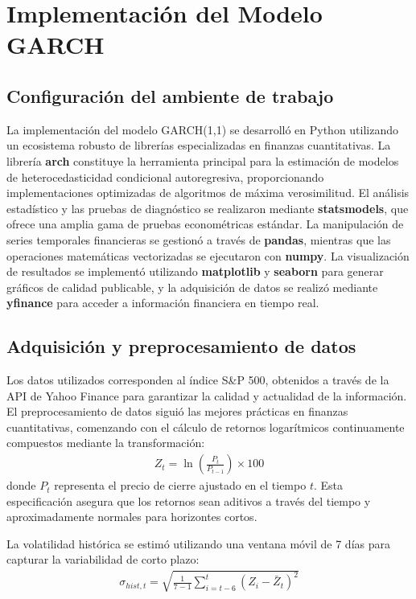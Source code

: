 \section{Implementación del Modelo GARCH}

\subsection{Configuración del ambiente de trabajo}

La implementación del modelo GARCH(1,1) se desarrolló en Python utilizando un ecosistema robusto de librerías especializadas en finanzas cuantitativas. La librería \textbf{arch} constituye la herramienta principal para la estimación de modelos de heterocedasticidad condicional autoregresiva, proporcionando implementaciones optimizadas de algoritmos de máxima verosimilitud. El análisis estadístico y las pruebas de diagnóstico se realizaron mediante \textbf{statsmodels}, que ofrece una amplia gama de pruebas econométricas estándar. La manipulación de series temporales financieras se gestionó a través de \textbf{pandas}, mientras que las operaciones matemáticas vectorizadas se ejecutaron con \textbf{numpy}. La visualización de resultados se implementó utilizando \textbf{matplotlib} y \textbf{seaborn} para generar gráficos de calidad publicable, y la adquisición de datos se realizó mediante \textbf{yfinance} para acceder a información financiera en tiempo real.

\subsection{Adquisición y preprocesamiento de datos}

Los datos utilizados corresponden al índice S\&P 500, obtenidos a través de la API de Yahoo Finance para garantizar la calidad y actualidad de la información. El preprocesamiento de datos siguió las mejores prácticas en finanzas cuantitativas, comenzando con el cálculo de retornos logarítmicos continuamente compuestos mediante la transformación:
\begin{align}
    Z_t = \ln\left(\frac{P_t}{P_{t-1}}\right) \times 100
\end{align}
donde $P_t$ representa el precio de cierre ajustado en el tiempo $t$. Esta especificación asegura que los retornos sean aditivos a través del tiempo y aproximadamente normales para horizontes cortos.

La volatilidad histórica se estimó utilizando una ventana móvil de 7 días para capturar la variabilidad de corto plazo:
\begin{align}
    \sigma_{hist,t} = \sqrt{\frac{1}{7-1}\sum_{i=t-6}^{t}(Z_i - \bar{Z}_t)^2}
\end{align}

